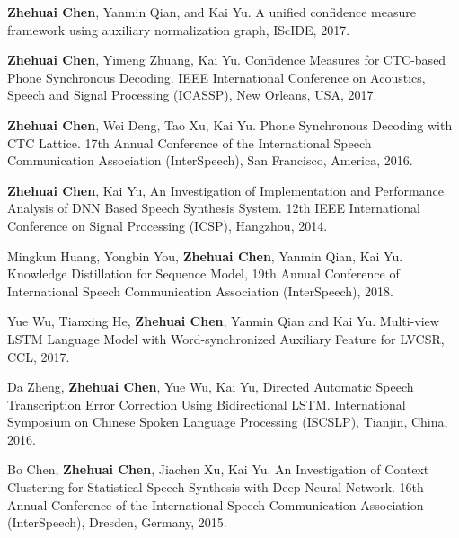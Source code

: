 \begin{publications}{99}
 \item {\bf Zhehuai Chen}, Yanmin Qian, and Kai Yu. A unified confidence measure framework using auxiliary normalization graph, IScIDE, 2017.
 \item {\bf Zhehuai Chen}, Yimeng Zhuang, Kai Yu. Confidence Measures for CTC-based Phone Synchronous Decoding. IEEE International Conference on Acoustics, Speech and Signal Processing (ICASSP), New Orleans, USA, 2017.
 \item {\bf Zhehuai Chen}, Wei Deng, Tao Xu, Kai Yu. Phone Synchronous Decoding with CTC Lattice. 17th Annual Conference of the International Speech Communication Association (InterSpeech), San Francisco, America, 2016.
 \item {\bf Zhehuai Chen}, Kai Yu, An Investigation of Implementation and Performance Analysis of DNN Based Speech Synthesis System. 12th IEEE International Conference on Signal Processing (ICSP), Hangzhou, 2014.
 \\
 \item Mingkun Huang, Yongbin You, {\bf Zhehuai Chen}, Yanmin Qian, Kai Yu. Knowledge Distillation for Sequence Model, 19th Annual Conference of  International Speech Communication Association (InterSpeech), 2018.
 \item Yue Wu, Tianxing He, {\bf Zhehuai Chen}, Yanmin Qian and Kai Yu. Multi-view LSTM Language Model with Word-synchronized Auxiliary Feature for LVCSR, CCL, 2017.
 \item Da Zheng, {\bf Zhehuai Chen}, Yue Wu, Kai Yu, Directed Automatic Speech Transcription Error Correction Using Bidirectional LSTM. International Symposium on Chinese Spoken Language Processing (ISCSLP), Tianjin, China, 2016.
 \item Bo Chen, {\bf Zhehuai Chen}, Jiachen Xu, Kai Yu. An Investigation of Context Clustering for Statistical Speech Synthesis with Deep Neural Network. 16th Annual Conference of the International Speech Communication Association (InterSpeech), Dresden, Germany, 2015.
\end{publications}
